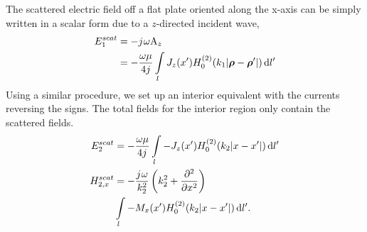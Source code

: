 \documentclass{ieeeaccess}
\renewcommand{\O}{\omega}  %
\renewcommand{\u}{\mu}  %
\newcommand{\p}{\rho}  %
\newcommand{\vp}{\boldsymbol \p}  %
\renewcommand{\^}{\hat}  %
\newcommand*\diff{\mathop{}\!\mathrm{d}} %
\renewcommand{\j}{{j}\mkern1mu} %
\begin{document}
%
The scattered electric field off a flat plate oriented along the x-axis can be simply written in a scalar form due to a $z$-directed incident wave,
%
\begin{equation}
  \begin{split}
    E_1^{scat} &= -\j \O \mathrm A_z \\
    &= - \frac{\O \u}{4 j} \int\limits_{l} J_z(x')  H_0^{(2)}(k_1 |\vp - \vp'|) \diff{l'}
    \label{eq:E1sc_scalar}
  \end{split}
\end{equation}
%
%
Using a similar procedure, we set up an interior equivalent with the currents reversing the signs. The total fields for the interior region only contain the scattered fields.
%
\begin{subequations}
  \begin{align}
    E_2^{scat} &= -\frac{\O \u}{4 \j} \int\limits_{l} -J_z(x')  H_0^{(2)}(k_2 |x - x'|) \diff{l'}
    \label{eq:E2sc}\\
    H_{2,x}^{scat} &= - \frac{\j \O}{k_2^2}\left(k_2^2 +  \pdv[2]{}{x} \right) \nonumber \\  & \int\limits_{l} -M_x(x') H_0^{(2)}(k_2 |x - x'|) \diff{l'}.
    \label{eq:H2sc}
  \end{align}
  \label{eq:2sc}%
\end{subequations}%
\end{document}
